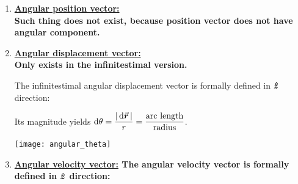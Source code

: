 \documentclass[class=article, crop=false, 12pt]{standalone}
\begin{document}
\begin{enumerate}
    \item \bf{\ul{Angular position vector:}}\\[1ex]
    Such thing does not exist, 
    because position vector does not have angular component. 
    
    \item \bf{\ul{Angular displacement vector:}}\\[1ex]
    Only exists in the infinitestimal version.

    The infinitestimal angular displacement vector is formally defined in $\vu*{z}$ direction:
    
    \begin{minipage}{0.55\linewidth}
        Its magnitude yields $\displaystyle \dd{\theta} = \frac{|\dd{\va*{r}}|}{r} = \frac{\text{arc length}}{\text{radius}}$.
    \end{minipage}
    \hspace{0.01\textwidth}
    \begin{minipage}{0.42\linewidth}
        \centering
        \texttt{[image: angular\_theta]}
    \end{minipage}

    \item \bf{\ul{Angular velocity vector:}}
    The angular velocity vector is formally defined in $\vu*{z}$ direction:
    


\end{enumerate}
\end{document}
